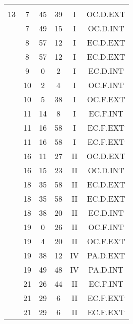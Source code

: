 \documentclass[12pt, a4paper]{article}
\begin{document}
\begin{multicols}{3}
{\begin{tabular}{c c c c c c}
	 	 	 	 & & & & & \\%
	 	 	 	13 & 7 & 45 & 39 & I & OC.D.EXT\\%
	 	 	 	 & 7 & 49 & 15 & I & OC.D.INT\\%
	 	 	 	 & 8 & 57 & 12 & I & EC.D.EXT\\%
	 	 	 	 & 8 & 57 & 12 & I & EC.D.EXT\\%
	 	 	 	 & 9 & 0 & 2 & I & EC.D.INT\\%
	 	 	 	 & 10 & 2 & 4 & I & OC.F.INT\\%
	 	 	 	 & 10 & 5 & 38 & I & OC.F.EXT\\%
	 	 	 	 & 11 & 14 & 8 & I & EC.F.INT\\%
	 	 	 	 & 11 & 16 & 58 & I & EC.F.EXT\\%
	 	 	 	 & 11 & 16 & 58 & I & EC.F.EXT\\%
	 	 	 	 & 16 & 11 & 27 & II & OC.D.EXT\\%
	 	 	 	 & 16 & 15 & 23 & II & OC.D.INT\\%
	 	 	 	 & 18 & 35 & 58 & II & EC.D.EXT\\%
	 	 	 	 & 18 & 35 & 58 & II & EC.D.EXT\\%
	 	 	 	 & 18 & 38 & 20 & II & EC.D.INT\\%
	 	 	 	 & 19 & 0 & 26 & II & OC.F.INT\\%
	 	 	 	 & 19 & 4 & 20 & II & OC.F.EXT\\%
	 	 	 	 & 19 & 38 & 12 & IV & PA.D.EXT\\%
	 	 	 	 & 19 & 49 & 48 & IV & PA.D.INT\\%
	 	 	 	 & 21 & 26 & 44 & II & EC.F.INT\\%
	 	 	 	 & 21 & 29 & 6 & II & EC.F.EXT\\%
	 	 	 	 & 21 & 29 & 6 & II & EC.F.EXT\\%

\end{tabular}}
\end{multicols}
\end{document}
